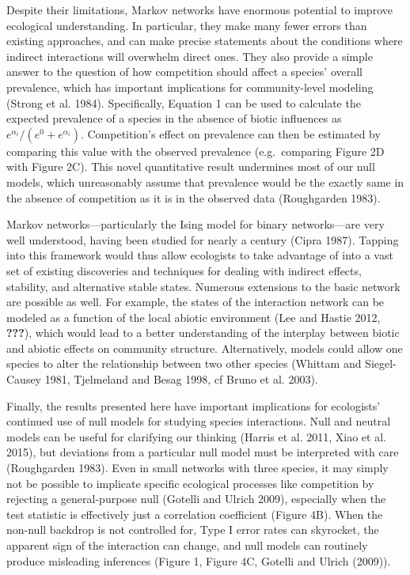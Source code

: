 \documentclass[12pt,]{article}
\begin{document}
\begin{spacing}{1.9}
\begin{flushleft}
Despite their limitations, Markov networks have enormous potential to
improve ecological understanding. In particular, they make many fewer
errors than existing approaches, and can make precise statements about
the conditions where indirect interactions will overwhelm direct ones.
They also provide a simple answer to the question of how competition
should affect a species' overall prevalence, which has important
implications for community-level modeling (Strong et al. 1984).
Specifically, Equation 1 can be used to calculate the expected
prevalence of a species in the absence of biotic influences as
\(e^{\alpha_i}/(e^{0} + e^{\alpha_i})\). Competition's effect on
prevalence can then be estimated by comparing this value with the
observed prevalence (e.g.~comparing Figure 2D with Figure 2C). This
novel quantitative result undermines most of our null models, which
unreasonably assume that prevalence would be the exactly same in the
absence of competition as it is in the observed data (Roughgarden 1983).

Markov networks---particularly the Ising model for binary networks---are
very well understood, having been studied for nearly a century (Cipra
1987). Tapping into this framework would thus allow ecologists to take
advantage of into a vast set of existing discoveries and techniques for
dealing with indirect effects, stability, and alternative stable states.
Numerous extensions to the basic network are possible as well. For
example, the states of the interaction network can be modeled as a
function of the local abiotic environment (Lee and Hastie 2012,
{\textbf{???}}), which would lead to a better understanding of the
interplay between biotic and abiotic effects on community structure.
Alternatively, models could allow one species to alter the relationship
between two other species (Whittam and Siegel-Causey 1981, Tjelmeland
and Besag 1998, cf Bruno et al. 2003).

Finally, the results presented here have important implications for
ecologists' continued use of null models for studying species
interactions. Null and neutral models can be useful for clarifying our
thinking (Harris et al. 2011, Xiao et al. 2015), but deviations from a
particular null model must be interpreted with care (Roughgarden 1983).
Even in small networks with three species, it may simply not be possible
to implicate specific ecological processes like competition by rejecting
a general-purpose null (Gotelli and Ulrich 2009), especially when the
test statistic is effectively just a correlation coefficient (Figure
4B). When the non-null backdrop is not controlled for, Type I error
rates can skyrocket, the apparent sign of the interaction can change,
and null models can routinely produce misleading inferences (Figure 1,
Figure 4C, Gotelli and Ulrich (2009)).


\end{flushleft}
\end{spacing}
\end{document}
